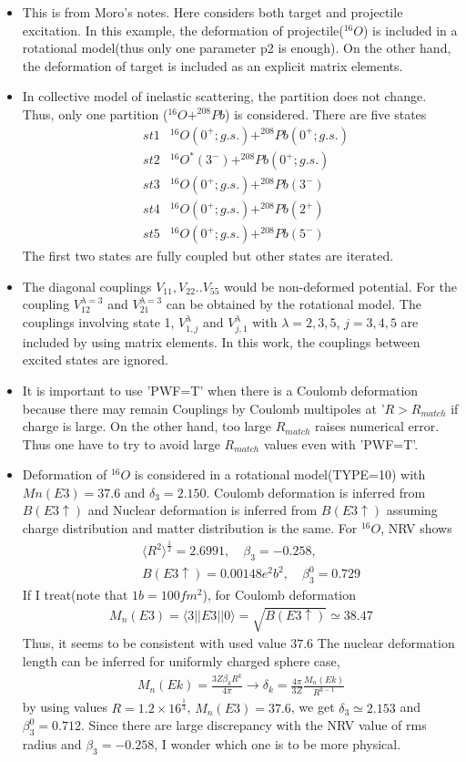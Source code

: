 \documentclass[11pt]{book}
\def\la{\langle}
\def\ra{\rangle}
\newcommand{\bea}{\begin{eqnarray}}
\newcommand{\eea}{\end{eqnarray}}
\newcommand{\no}{\nonumber \\}
\begin{document}
\begin{itemize}
\item This is from Moro's notes. Here considers both target and projectile
      excitation. In this example, the deformation of projectile($^{16}O$) is included in
      a rotational model(thus only one parameter p2 is enough).
      On the other hand, the deformation of target is included as an
      explicit matrix elements.
\item In collective model of inelastic scattering, the partition does not 
      change. Thus, only one partition ($^{16}O+^{208}Pb$) is considered.
      There are five states
      \bea
       &st1 & ^{16}O(0^+; g.s.)+^{208}Pb(0^+;g.s.)  \no 
       &st2 & ^{16}O^*(3^{-})+^{208}Pb(0^+;g.s.) \no 
       &st3 & ^{16}O(0^+; g.s.)+^{208}Pb(3^-) \no
       &st4 & ^{16}O(0^+; g.s.)+^{208}Pb(2^+) \no
       &st5 & ^{16}O(0^+; g.s.)+^{208}Pb(5^-) 
      \eea
      The first two states are fully coupled but other states are
      iterated. 
\item The diagonal couplings $V_{11},V_{22}..V_{55}$ would be non-deformed potential.
      For the coupling $V^{\lambda=3}_{12}$ and $V^{\lambda=3}_{21}$ can be obtained by the rotational model. 
      The couplings involving state 1,
      $V^\lambda_{1, j}$ and $V^\lambda_{j,1}$
      with $\lambda=2,3,5$, $j=3,4,5$
      are included by using matrix elements. 
      In this work, the couplings between excited states are ignored. 

\item {\color{red} It is important to use 'PWF=T' when there is a Coulomb deformation because         
	   there may remain Couplings by Coulomb multipoles at '$R> R_{match}$ if charge is large.
	   On the other hand, too large $R_{match}$ raises numerical error. 
	   Thus one have to try to avoid large $R_{match}$ values even with 'PWF=T'. 
      }
      
\item Deformation of $^{16}O$ is considered in a rotational model(TYPE=10)
     with $Mn(E3)=37.6$ and $\delta_3=2.150$. 
      Coulomb deformation is inferred from $B(E3\uparrow)$ and 
      Nuclear deformation is inferred from $B(E3\uparrow)$ assuming
      charge distribution and matter distribution is the same. 
      For $^{16}O$, NRV shows
      \bea 
      & &\la R^2\ra^{\frac{1}{2}}=2.6991, \quad \beta_3=-0.258,\no 
      & &B(E3\uparrow)=0.00148 e^2 b^2,\quad \beta_3^0=0.729
      \eea        
      If I treat(note that $1b=100 fm^2$), for Coulomb deformation
      \bea 
      M_n(E3)=\la 3||E3||0\ra =\sqrt{B(E3\uparrow)}\simeq 38.47 
      \eea 
      Thus, it seems to be consistent with used value $37.6$
      The nuclear deformation length can be inferred for uniformly charged
      sphere case, 
      \bea 
      M_n(Ek)=\frac{3 Z\beta_k R^k}{4\pi} \to
       \delta_k=\frac{4\pi}{3Z}\frac{M_n(Ek)}{R^{k-1}}
      \eea 
      by using values $R=1.2\times 16^{\frac{1}{3}}$, $M_n(E3)=37.6$, we get
      $\delta_3\simeq 2.153$ and $\beta_3^0=0.712$.
      Since there are large discrepancy with 
      the NRV value of rms radius and $\beta_3=-0.258$,
      I wonder which one is to be more physical.
                   

\end{itemize}
\end{document}
